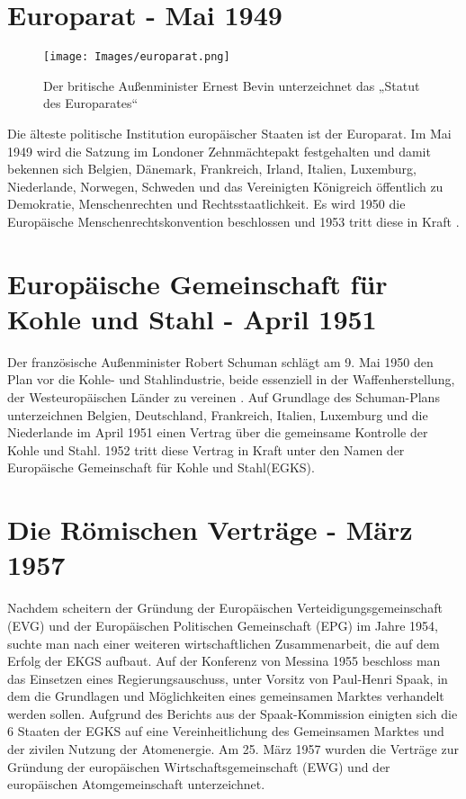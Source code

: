 \documentclass[12pt, oneside]{book} %
\begin{document}
\section{Europarat - Mai 1949}
\begin{wrapfigure}{r}{0.5\textwidth} 
    \centering
    \texttt{[image: Images/europarat.png]} 
    \caption{Der britische Außenminister Ernest Bevin unterzeichnet das „Statut des Europarates“}
    \label{fig:wrap}
\end{wrapfigure}
Die älteste politische Institution europäischer Staaten ist der Europarat. Im Mai 1949 wird die Satzung im Londoner Zehnmächtepakt festgehalten und damit bekennen sich Belgien, Dänemark, Frankreich, Irland, Italien, Luxemburg, Niederlande, Norwegen, Schweden und das Vereinigten Königreich öffentlich zu Demokratie, Menschenrechten und Rechtsstaatlichkeit. Es wird 1950 die Europäische Menschenrechtskonvention beschlossen und 1953 tritt diese in Kraft \parencite[]{euConventionOfHumanRights-Plan}.



\section{Europäische Gemeinschaft für Kohle und Stahl - April 1951}
Der französische Außenminister Robert Schuman schlägt am 9. Mai 1950 den Plan vor die Kohle- und Stahlindustrie, beide essenziell in der Waffenherstellung, der Westeuropäischen Länder zu vereinen \parencite[]{Schuman-Plan}. Auf Grundlage des Schuman-Plans unterzeichnen Belgien, Deutschland, Frankreich, Italien, Luxemburg und die Niederlande im April 1951 einen Vertrag über die gemeinsame Kontrolle der Kohle und Stahl. 1952 tritt diese Vertrag in Kraft unter den Namen der Europäische Gemeinschaft für Kohle und Stahl(EGKS).

\section{Die Römischen Verträge - März 1957}
Nachdem scheitern der Gründung der Europäischen Verteidigungsgemeinschaft (EVG) und der Europäischen Politischen Gemeinschaft (EPG) im Jahre 1954, suchte man nach einer weiteren wirtschaftlichen Zusammenarbeit, die auf dem Erfolg der EKGS aufbaut. Auf der Konferenz von Messina 1955 beschloss man das Einsetzen eines Regierungsauschuss, unter Vorsitz von Paul-Henri Spaak, in dem die Grundlagen und Möglichkeiten eines gemeinsamen Marktes verhandelt werden sollen. Aufgrund des Berichts aus der Spaak-Kommission \parencite[]{Spaak-Bericht} einigten sich die 6 Staaten der EGKS  auf eine Vereinheitlichung des Gemeinsamen Marktes und der zivilen Nutzung der Atomenergie. Am 25. März 1957 wurden die Verträge zur Gründung der europäischen Wirtschaftsgemeinschaft (EWG) und der europäischen Atomgemeinschaft unterzeichnet. 
\end{document}
